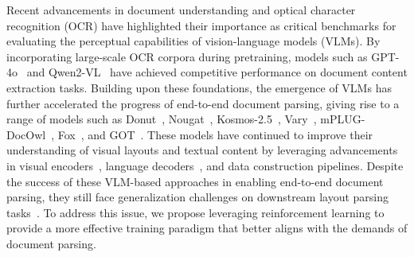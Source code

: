  

Recent advancements in document understanding and optical character recognition (OCR) have highlighted their importance as critical benchmarks for evaluating the perceptual capabilities of vision-language models (VLMs). By incorporating large-scale OCR corpora during pretraining, models such as GPT-4o~\citep{GPT4} and Qwen2-VL~\citep{Qwen-VL} have achieved competitive performance on document content extraction tasks. Building upon these foundations, the emergence of  VLMs has further accelerated the progress of end-to-end document parsing, giving rise to a range of models such as Donut~\citep{Nougat}, Nougat~\citep{blecher2023nougat}, Kosmos-2.5~\citep{KOSMOS-2.5}, Vary~\citep{Vary}, mPLUG-DocOwl~\citep{hu2024mplug2}, Fox~\citep{fox}, and GOT~\citep{got2}. These models have continued to improve their understanding of visual layouts and textual content by leveraging advancements in visual encoders~\citep{dosovitskiy2020image}, language decoders~\citep{Qwen-VL}, and data construction pipelines. Despite the success of these VLM-based approaches in enabling end-to-end document parsing, they still face generalization challenges on downstream layout parsing tasks~\citep{MinerU}. To address this issue, we propose leveraging reinforcement learning to provide a more effective training paradigm that better aligns with the demands of document parsing.










